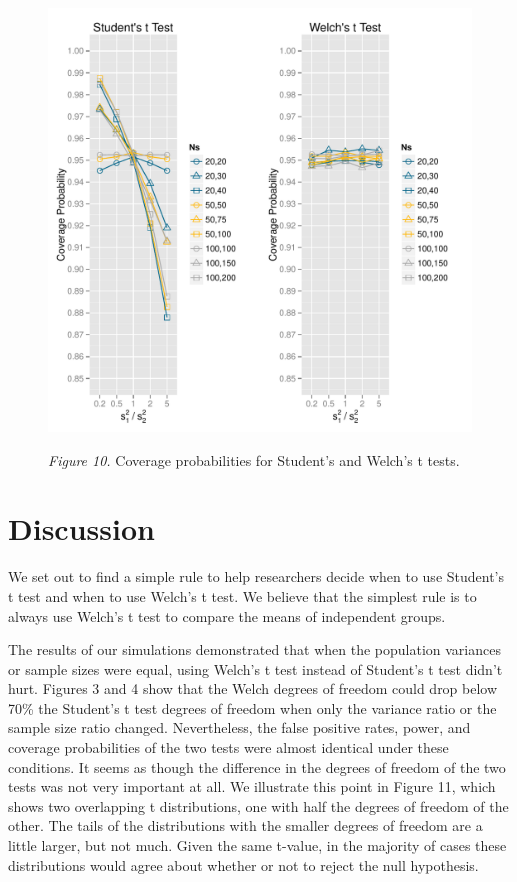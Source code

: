 \documentclass[man,a4paper,noextraspace,apacite]{apa6}\usepackage[]{graphicx}\usepackage[]{color}
\makeatletter
\def\maxwidth{ %
  \ifdim\Gin@nat@width>\linewidth
    \linewidth
  \else
    \Gin@nat@width
  \fi
}
\newenvironment{knitrout}{}{} %
\makeatother
\begin{document}
\begin{figure}
\begin{knitrout}
\color{fgcolor}
\includegraphics[width=\maxwidth]{figure/coverage_plots} 

\end{knitrout}
\textit{Figure 10.} Coverage probabilities for Student's and Welch's t tests.
\end{figure}

\section{Discussion}
    We set out to find a simple rule to help researchers decide when to use Student's t test and when to use Welch's t test. We believe that the simplest rule is to always use Welch's t test to compare the means of independent groups.
    
    The results of our simulations demonstrated that when the population variances or sample sizes were equal, using Welch's t test instead of Student's t test didn't hurt. Figures 3 and 4 show that the Welch degrees of freedom could drop below 70\% the Student's t test degrees of freedom when only the variance ratio or the sample size ratio changed. Nevertheless, the false positive rates, power, and coverage probabilities of the two tests were almost identical under these conditions. It seems as though the difference in the degrees of freedom of the two tests was not very important at all. We illustrate this point in Figure 11, which shows two overlapping t distributions, one with half the degrees of freedom of the other. The tails of the distributions with the smaller degrees of freedom are a little larger, but not much. Given the same t-value, in the majority of cases these distributions would agree about whether or not to reject the null hypothesis. 
    
\end{document}
